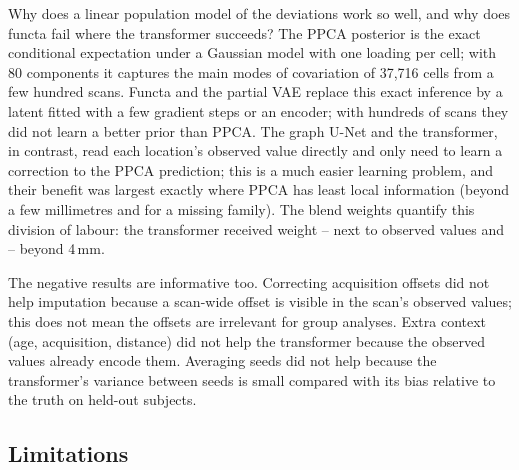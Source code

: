 \documentclass[11pt]{article}
\begin{document}
Why does a linear population model of the deviations work so well, and why does functa fail where the transformer
succeeds? The PPCA posterior is the exact conditional expectation under a Gaussian model with one loading per cell;
with 80 components it captures the main modes of covariation of 37,716 cells from a few hundred scans. Functa and
the partial VAE replace this exact inference by a latent fitted with a few gradient steps or an encoder; with
hundreds of scans they did not learn a better prior than PPCA. The graph U-Net and the transformer, in contrast, read
each location's observed value directly and only need to learn a correction to the PPCA prediction; this is a much
easier learning problem, and their benefit was largest exactly where PPCA has least local information (beyond a few
millimetres and for a missing family). The blend weights quantify this division of labour: the transformer received
weight \wtCNearMin--\wtCNearMax{} next to observed values and \wtCFarMin--\wtCFarMax{} beyond 4\,mm.

The negative results are informative too. Correcting acquisition offsets did not help imputation because a
scan-wide offset is visible in the scan's observed values; this does not mean the offsets are irrelevant for group
analyses. Extra context (age, acquisition, distance) did not help the transformer because the observed values already
encode them. Averaging seeds did not help because the transformer's variance between seeds is small compared with
its bias relative to the truth on held-out subjects.

\subsection{Limitations}
\end{document}
